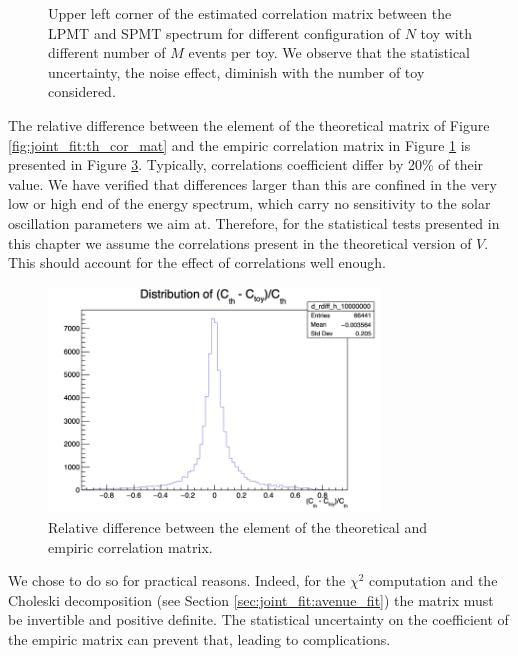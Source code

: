 \documentclass[../main.tex]{subfiles}
\begin{document}
\begin{figure}[ht]
\begin{subfigure}[t]{0.33\linewidth}
    \caption{}
    \label{fig:joint_fit:empirical_cor:cheff_kiss}
  \end{subfigure}
  \caption{Upper left corner of the estimated correlation matrix between the LPMT and SPMT spectrum for different configuration of $N$ toy with different number of $M$ events per toy. We observe that the statistical uncertainty, the noise effect, diminish with the number of toy considered.}
  \label{fig:joint_fit:empirical_cor}
\end{figure}


The relative difference between the element of the theoretical matrix of Figure \ref{fig:joint_fit:th_cor_mat} and the empiric correlation matrix in Figure \ref{fig:joint_fit:empirical_cor:cheff_kiss} is presented in Figure \ref{fig:joint_fit:th_em_diff}.
Typically,  correlations coefficient differ by 20\% of their value. We have verified that differences larger than this are confined in the very low or high end of the energy spectrum, which carry no sensitivity to the solar oscillation parameters we aim at. Therefore, for the statistical tests presented in this chapter we assume the correlations present in the theoretical version of $V$. This should account for the effect of correlations well enough.

\begin{figure}[ht]
  \centering
  \includegraphics[height=6cm]{images/joint_fit/th_em_corr_diff.png}
  \caption{Relative difference between the element of the theoretical and empiric correlation matrix.}
  \label{fig:joint_fit:th_em_diff}
\end{figure}

We chose to do so for practical reasons. Indeed, for the $\chi^2$ computation and the Choleski decomposition (see Section \ref{sec:joint_fit:avenue_fit}) the matrix must be invertible and positive definite. The statistical uncertainty on the coefficient of the empiric matrix can prevent that, leading to complications.
\end{document}

